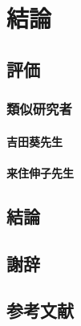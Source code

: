 \documentclass[a4paper,10pt,onecolumn,oneside,openany]{jsbook}
\begin{document}
\part{結論}
\chapter{評価}
\section{類似研究者}
\subsection{吉田葵先生}
\subsection{来住伸子先生}

\chapter{結論}


%
\chapter{謝辞}
%
%
%
\chapter{参考文献}
%
\end{document}
